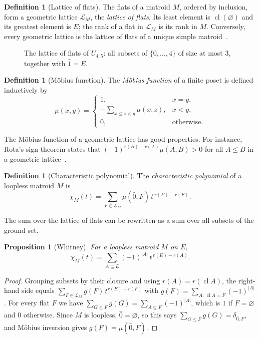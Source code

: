 \documentclass[11pt,a4paper]{article}
\numberwithin{equation}{section}
\theoremstyle{plain}
\newtheorem{proposition}[theorem]{Proposition}
\theoremstyle{definition}
\newtheorem{definition}[theorem]{Definition}
\theoremstyle{remark}
\newcommand{\cL}{\mathcal{L}}
\DeclareMathOperator{\cl}{cl}
\begin{document}
\begin{definition}[Lattice of flats]
The flats of a matroid $M$, ordered by inclusion, form a geometric lattice $\cL_M$, the \emph{lattice of flats}. Its least element is $\cl(\varnothing)$ and its greatest element is $E$; the rank of a flat in $\cL_M$ is its rank in $M$. Conversely, every geometric lattice is the lattice of flats of a unique simple matroid~\cite{Oxl11}.
\end{definition}

\begin{figure}[ht]
\centering

\caption{The lattice of flats of $U_{4,5}$: all subsets of $\{0,\dots,4\}$ of size at most $3$, together with $\hat1=E$.}
\label{fig:u45}
\end{figure}

\begin{definition}[Möbius function]
The \emph{Möbius function} of a finite poset is defined inductively by
\[
\mu(x,y)=\begin{cases}1,& x=y,\\ -\sum_{x\leqslant z<y}\mu(x,z),& x<y,\\ 0,&\text{otherwise.}\end{cases}
\]
\end{definition}

The Möbius function of a geometric lattice has good properties. For instance, Rota's sign theorem states that $(-1)^{r(B)-r(A)}\mu(A,B)>0$ for all $A\leqslant B$ in a geometric lattice~\cite{Bjo92}.

\begin{definition}[Characteristic polynomial]
The \emph{characteristic polynomial} of a loopless matroid $M$ is
\[
\chi_M(t)=\sum_{F\in\cL_M}\mu(\hat0,F)\,t^{\,r(E)-r(F)}.
\]
\end{definition}

The sum over the lattice of flats can be rewritten as a sum over all subsets of the ground set.

\begin{proposition}[Whitney]\label{prop:whitney}
For a loopless matroid $M$ on $E$,
\[
\chi_M(t)=\sum_{A\subseteq E}(-1)^{|A|}\,t^{\,r(E)-r(A)}.
\]
\end{proposition}
\begin{proof}
Grouping subsets by their closure and using $r(A)=r(\cl A)$, the right-hand side equals $\sum_{F\in\cL_M}g(F)\,t^{r(E)-r(F)}$ with $g(F)=\sum_{A:\,\cl A=F}(-1)^{|A|}$. For every flat $F$ we have $\sum_{G\leqslant F}g(G)=\sum_{A\subseteq F}(-1)^{|A|}$, which is $1$ if $F=\varnothing$ and $0$ otherwise. Since $M$ is loopless, $\hat0=\varnothing$, so this says $\sum_{G\leqslant F}g(G)=\delta_{\hat0,F}$, and Möbius inversion gives $g(F)=\mu(\hat0,F)$.
\end{proof}
\end{document}
